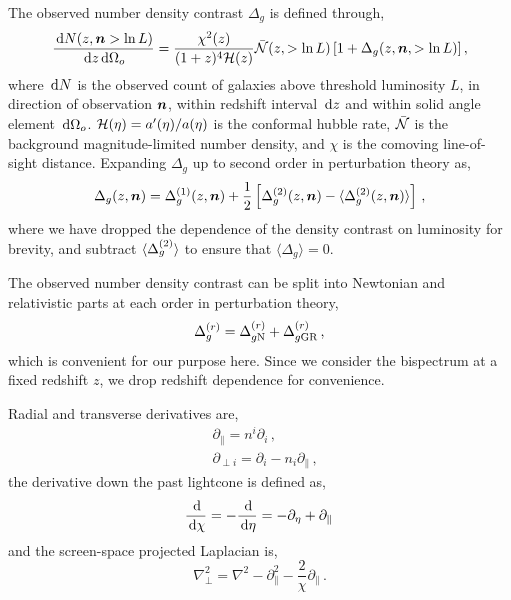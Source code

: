 The observed number density contrast $\Delta_g$ is defined through, 
\begin{equation}
	\frac{\,\mathrm{d} N(z, \bm {n} > \ln L)}{\,\mathrm{d} z \,\mathrm{d} \Omega_o} = \frac{\chi^2(z)}{(1 + z)^4 \mathcal{H}(z)} \bar{\mathcal{N}}(z, > \ln L) \left[ 1 + \Delta_g(z, \bm {n}, >\ln L) \right],
\end{equation}
where $\,\mathrm{d} N$ is the observed count of galaxies above threshold luminosity $L$, in direction of observation $\bm {n}$, within redshift interval $\,\mathrm{d} z$ and within solid angle element $\,\mathrm{d} \Omega_o$. $\mathcal{H}(\eta) = a'(\eta)/a(\eta)$ is the conformal hubble rate, $\bar{\mathcal{N}}$ is the background magnitude-limited number density, and $\chi$ is the comoving line-of-sight distance. Expanding $\Delta_g$ up to second order in perturbation theory as, 
\begin{equation}
	\Delta_g(z,\bm {n}) = \Delta_g^{(1)}(z, \bm {n}) + \frac{1}{2} \left[ \Delta_g^{(2)}(z,\bm {n}) - \langle \Delta_g^{(2)}(z,\bm {n})\rangle \right]\,,
\end{equation}
where we have dropped the dependence of the density contrast on luminosity for brevity, and subtract $\langle \Delta_g^{(2)} \rangle$ to ensure that $\langle \Delta_g \rangle = 0$. 

The observed number density contrast can be split into Newtonian and relativistic parts at each order in perturbation theory,
\begin{equation}
	\Delta_g^{(r)} = \Delta_{g \mathrm{N}}^{(r)} + \Delta_{g \mathrm{GR}}^{(r)}\,,
\end{equation}
which is convenient for our purpose here. Since we consider the bispectrum at a fixed redshift $z$, we drop redshift dependence for convenience. 

Radial and transverse derivatives are, 
\begin{align}
	&\partial_{\parallel} = n^i \partial_i\,,\label{eq:partialparalleldef} \\
	&\partial_{\perp i} = \partial_i - n_i \partial_\parallel\,,\label{eq:partialperpdef}
\end{align}
the derivative down the past lightcone is defined as, 
\begin{equation}
	\frac{\,\mathrm{d}}{\,\mathrm{d} \chi} = - \frac{\,\mathrm{d}}{\,\mathrm{d} \eta} = - \partial_\eta + \partial_\parallel\,\label{eq:ddchidef}
\end{equation}
and the screen-space projected Laplacian is, 
\begin{equation}
	\nabla^2_\perp = \nabla^2 - \partial_\parallel^2 - \frac{2}{\chi} \partial_\parallel\,.
\end{equation}

